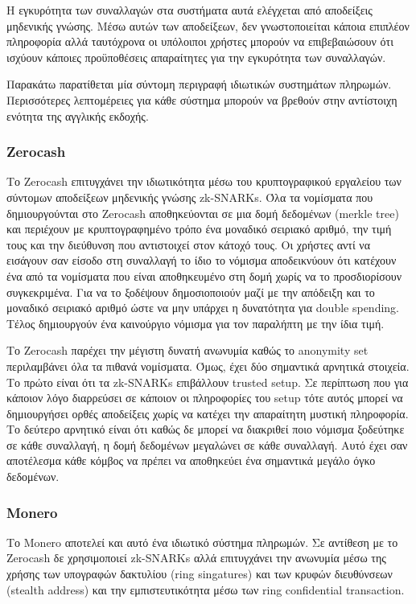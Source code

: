 Η εγκυρότητα των συναλλαγών στα συστήματα αυτά ελέγχεται από αποδείξεις μηδενικής γνώσης. Μέσω αυτών των αποδείξεων, δεν γνωστοποιείται κάποια επιπλέον πληροφορία αλλά ταυτόχρονα οι υπόλοιποι χρήστες μπορούν να επιβεβαιώσουν ότι ισχύουν κάποιες προϋποθέσεις απαραίτητες για την εγκυρότητα των συναλλαγών.

Παρακάτω παρατίθεται μία σύντομη περιγραφή ιδιωτικών συστημάτων πληρωμών. Περισσότερες λεπτομέρειες για κάθε σύστημα μπορούν να βρεθούν στην αντίστοιχη ενότητα της αγγλικής εκδοχής.

\subsubsection{Zerocash}
Το Zerocash επιτυγχάνει την ιδιωτικότητα μέσω του κρυπτογραφικού εργαλείου των σύντομων αποδείξεων μηδενικής γνώσης zk-SNARKs. Όλα τα νομίσματα που δημιουργούνται στο Zerocash αποθηκεύονται σε μια δομή δεδομένων (merkle tree) και περιέχουν με κρυπτογραφημένο τρόπο ένα μοναδικό σειριακό αριθμό, την τιμή τους και την διεύθυνση που αντιστοιχεί στον κάτοχό τους. Οι χρήστες αντί να εισάγουν σαν είσοδο στη συναλλαγή το ίδιο το νόμισμα αποδεικνύουν ότι κατέχουν ένα από τα νομίσματα που είναι αποθηκευμένο στη δομή χωρίς να το προσδιορίσουν συγκεκριμένα. Για να το ξοδέψουν δημοσιοποιούν μαζί με την απόδειξη και το μοναδικό σειριακό αριθμό ώστε να μην υπάρχει η δυνατότητα για double spending. Τέλος δημιουργούν ένα καινούργιο νόμισμα για τον παραλήπτη με την ίδια τιμή.

Το Zerocash παρέχει την μέγιστη δυνατή ανωνυμία καθώς το anonymity set περιλαμβάνει όλα τα πιθανά νομίσματα. Όμως, έχει δύο σημαντικά αρνητικά στοιχεία. Το πρώτο είναι ότι τα zk-SNARKs επιβάλλουν trusted setup. Σε περίπτωση που για κάποιον λόγο διαρρεύσει σε κάποιον οι πληροφορίες του setup τότε αυτός μπορεί να δημιουργήσει ορθές αποδείξεις χωρίς να κατέχει την απαραίτητη μυστική πληροφορία. Το δεύτερο αρνητικό είναι ότι καθώς δε μπορεί να διακριθεί ποιο νόμισμα ξοδεύτηκε σε κάθε συναλλαγή, η δομή δεδομένων μεγαλώνει σε κάθε συναλλαγή. Αυτό έχει σαν αποτέλεσμα κάθε κόμβος να πρέπει να αποθηκεύει ένα σημαντικά μεγάλο όγκο δεδομένων.

\subsubsection{Monero}
Το Monero αποτελεί και αυτό ένα ιδιωτικό σύστημα πληρωμών. Σε αντίθεση με το Zerocash δε χρησιμοποιεί zk-SNARKs αλλά επιτυγχάνει την ανωνυμία μέσω της χρήσης των υπογραφών δακτυλίου (ring singatures) και των κρυφών διευθύνσεων (stealth address) και την εμπιστευτικότητα μέσω των ring confidential transaction. 


